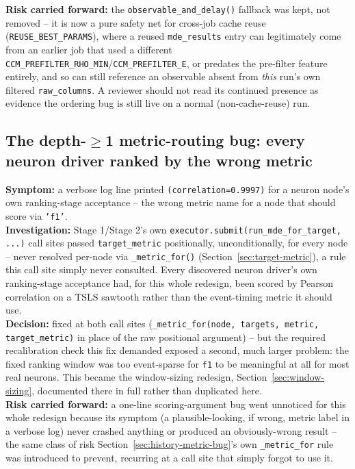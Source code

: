 \documentclass[11pt]{article}
\begin{document}
\textbf{Risk carried forward:} the \texttt{observable\_and\_delay()} fallback was kept, not removed -- it is now a pure safety net for cross-job cache reuse (\texttt{REUSE\_BEST\_PARAMS}), where a reused \texttt{mde\_results} entry can legitimately come from an earlier job that used a different \texttt{CCM\_PREFILTER\_RHO\_MIN}/\texttt{CCM\_PREFILTER\_E}, or predates the pre-filter feature entirely, and so can still reference an observable absent from \emph{this} run's own filtered \texttt{raw\_columns}. A reviewer should not read its continued presence as evidence the ordering bug is still live on a normal (non-cache-reuse) run.

\subsection{The depth-$\ge$1 metric-routing bug: every neuron driver ranked by the wrong metric}
\label{sec:history-metric-routing}
\textbf{Symptom:} a verbose log line printed \texttt{(correlation=0.9997)} for a neuron node's own ranking-stage acceptance -- the wrong metric name for a node that should score via \texttt{'f1'}.\\
\textbf{Investigation:} Stage 1/Stage 2's own \texttt{executor.submit(run\_mde\_for\_target, ...)} call sites passed \texttt{target\_metric} positionally, unconditionally, for every node -- never resolved per-node via \texttt{\_metric\_for()} (Section~\ref{sec:target-metric}), a rule this call site simply never consulted. Every discovered neuron driver's own ranking-stage acceptance had, for this whole redesign, been scored by Pearson correlation on a TSLS sawtooth rather than the event-timing metric it should use.\\
\textbf{Decision:} fixed at both call sites (\texttt{\_metric\_for(node, targets, metric, target\_metric)} in place of the raw positional argument) -- but the required recalibration check this fix demanded exposed a second, much larger problem: the fixed ranking window was too event-sparse for \texttt{f1} to be meaningful at all for most real neurons. This became the window-sizing redesign, Section~\ref{sec:window-sizing}, documented there in full rather than duplicated here.\\
\textbf{Risk carried forward:} a one-line scoring-argument bug went unnoticed for this whole redesign because its symptom (a plausible-looking, if wrong, metric label in a verbose log) never crashed anything or produced an obviously-wrong result -- the same class of risk Section~\ref{sec:history-metric-bug}'s own \texttt{\_metric\_for} rule was introduced to prevent, recurring at a call site that simply forgot to use it.
\end{document}
